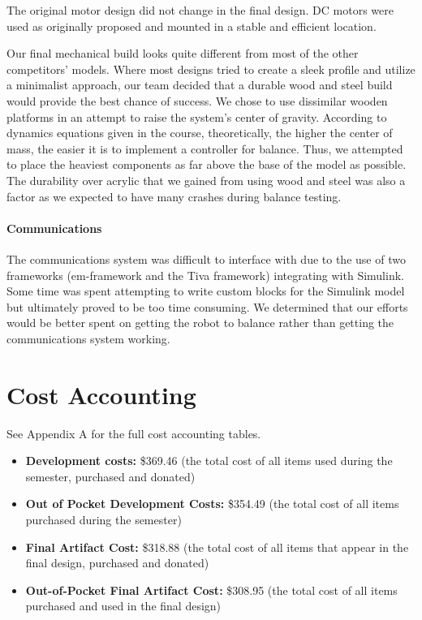 \documentclass[11pt]{report}
\begin{document}
\begin{spacing}{1.5}
        The original motor design did not change in the final design. DC motors were used as originally proposed and mounted in a stable and efficient location.
        
        Our final mechanical build looks quite different from most of the other competitors’ models. Where most designs tried to create a sleek profile and utilize a minimalist approach, our team decided that a durable wood and steel build would provide the best chance of success. We chose to use dissimilar wooden platforms in an attempt to raise the system’s center of gravity. According to dynamics equations given in the course, theoretically, the higher the center of mass, the easier it is to implement a controller for balance. Thus, we attempted to place the heaviest components as far above the base of the model as possible. The durability over acrylic that we gained from using wood and steel was also a factor as we expected to have many crashes during balance testing.
        
        \paragraph{Communications}
        
        The communications system was difficult to interface with due to the use of two frameworks (em-framework and the Tiva framework) integrating with Simulink. Some time was spent attempting to write custom blocks for the Simulink model but ultimately proved to be too time consuming. We determined that our efforts would be better spent on getting the robot to balance rather than getting the communications system working.

\section*{Cost Accounting}

See Appendix A for the full cost accounting tables.

\begin{itemize}[noitemsep,nolistsep]
    \item \textbf{Development costs:} \$369.46 (the total cost of all items used during the semester, purchased and donated)
    \item \textbf{Out of Pocket Development Costs:} \$354.49 (the total cost of all items purchased during the semester)
    \item \textbf{Final Artifact Cost:} \$318.88 (the total cost of all items that appear in the final design, purchased and donated)
    \item \textbf{Out-of-Pocket Final Artifact Cost:} \$308.95 (the total cost of all items purchased and used in the final design)


\end{itemize}
\end{spacing}
\end{document}
